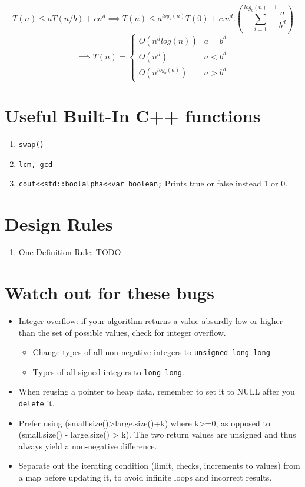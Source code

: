\documentclass{report}
\begin{document}
\begin{equation}
T(n) \le aT(n/b) + cn^d \implies
T(n) \le a^{log_b(n)}T(0) + c.n^d.(\sum_{i=1}^{log_b(n)-1}{\frac{a}{b^d}})
\end{equation}
\begin{equation}
\implies T(n) = 
\begin{cases}
O(n^dlog(n)) & a = b^d \\
O(n^d) & a < b^d \\
O(n^{log_b(a)}) & a > b^d 
\end{cases}    
\end{equation}

\section{Useful Built-In C++ functions}
\begin{enumerate}
\item \texttt{swap()}
\item \texttt{lcm, gcd}
\item \texttt{cout<<std::boolalpha<<var\_boolean;} Prints true or false instead 1 or 0.
\end{enumerate}
\section{Design Rules}
\begin{enumerate}
\item One-Definition Rule: TODO
\end{enumerate}
\section{Watch out for these bugs}
\begin{itemize}
\item Integer overflow: if your algorithm returns a value absurdly low or higher than the set of possible values, check for integer overflow.
\begin{itemize}
    \item Change types of all non-negative integers to \texttt{unsigned long long}
    \item Types of all signed integers to \texttt{long long}.
\end{itemize}
\item When reusing a pointer to heap data, remember to set it to NULL after you \texttt{delete} it.
\item Prefer using (small.size()>large.size()+k) where k>=0, as opposed to (small.size() - large.size() > k). The two return values are unsigned and thus always yield a non-negative difference.
\item Separate out the iterating condition (limit, checks, increments to values) from a map before updating it, to avoid infinite loops and incorrect results.
\end{itemize}
\end{document}
